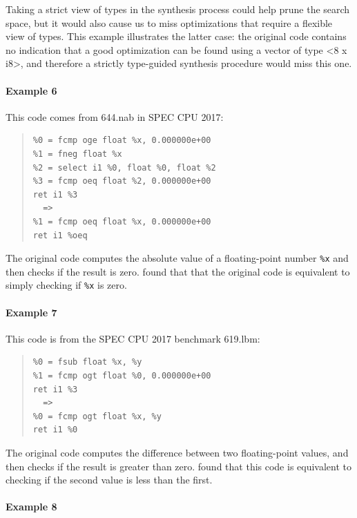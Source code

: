 Taking a strict view of types in the synthesis process could help
prune the search space, but it would also cause us to miss
optimizations that require a flexible view of types.
%
This example illustrates the latter case: the original code contains
no indication that a good optimization can be found using a vector of
type <8 x i8>, and therefore a strictly type-guided synthesis
procedure would miss this one.

\paragraph*{Example 6}

This code comes from 644.nab in SPEC CPU 2017:

{\begin{quote}\begin{verbatim}
%0 = fcmp oge float %x, 0.000000e+00
%1 = fneg float %x
%2 = select i1 %0, float %0, float %2
%3 = fcmp oeq float %2, 0.000000e+00
ret i1 %3
  =>
%1 = fcmp oeq float %x, 0.000000e+00
ret i1 %oeq
\end{verbatim}
\end{quote}}

The original code computes the absolute value of a floating-point
number \texttt{\%x} and then checks if the result is zero.
\minotaur{} found that that the original code is equivalent to simply checking if
\texttt{\%x} is zero.


\paragraph*{Example 7}

This code is from the SPEC CPU 2017 benchmark 619.lbm:

{\begin{quote}\begin{verbatim}
%0 = fsub float %x, %y
%1 = fcmp ogt float %0, 0.000000e+00
ret i1 %3
  =>
%0 = fcmp ogt float %x, %y
ret i1 %0
\end{verbatim}
\end{quote}}

The original code computes the difference between two floating-point
values, and then checks if the result is greater than zero. \minotaur{}
found that this code is equivalent to checking if the second value is
less than the first.


\paragraph*{Example 8}

